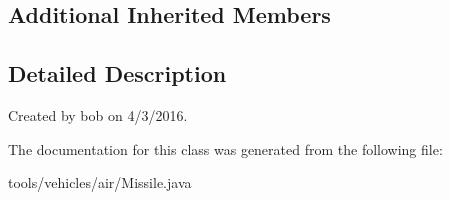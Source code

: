 \subsection*{Additional Inherited Members}


\subsection{Detailed Description}
Created by bob on 4/3/2016. 

The documentation for this class was generated from the following file\+:\begin{DoxyCompactItemize}
\item 
tools/vehicles/air/Missile.\+java\end{DoxyCompactItemize}
